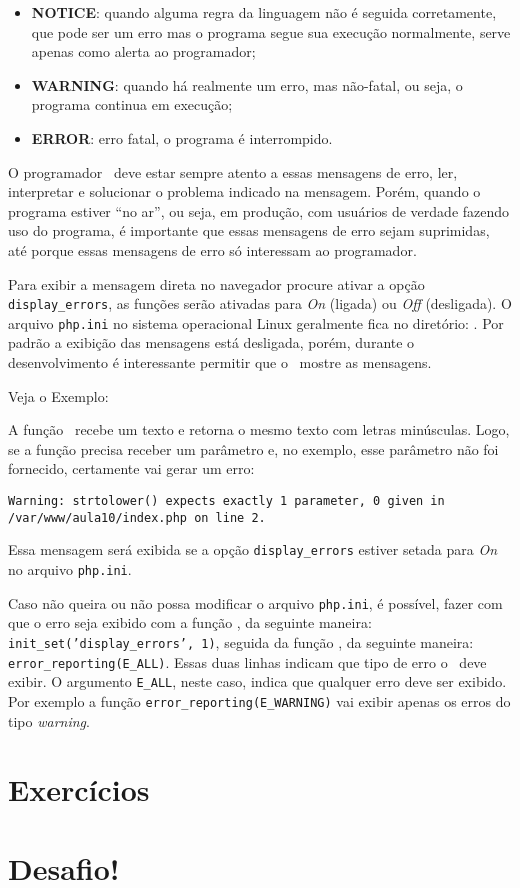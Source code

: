 \begin{itemize}
  \item \textbf{NOTICE}: quando alguma regra da linguagem não é seguida corretamente, 
  que pode ser um erro mas o programa segue sua execução normalmente, serve apenas 
  como alerta ao programador;
  \item \textbf{WARNING}: quando há realmente um erro, mas não-fatal, ou seja, 
  o programa continua em execução;
  \item \textbf{ERROR}: erro fatal, o programa é interrompido.
\end{itemize}

O programador \php~deve estar sempre atento a essas mensagens de erro, ler, interpretar e 
solucionar o problema indicado na mensagem. Porém, quando o programa estiver ``no ar'', 
ou seja, em produção, com usuários de verdade fazendo uso do programa, é importante que 
essas mensagens de erro sejam suprimidas, até porque essas mensagens de erro só interessam 
ao programador.

Para exibir a mensagem direta no navegador procure ativar a opção \texttt{display\_errors}, 
as funções serão ativadas para \textit{On} (ligada) ou \textit{Off} (desligada). O arquivo 
\texttt{php.ini} no sistema operacional Linux geralmente fica no diretório: 
. Por padrão a exibição das mensagens está desligada, porém, 
durante o desenvolvimento é interessante permitir que o \php~mostre as mensagens.

Veja o Exemplo:



A função \funcaostrtolower~recebe um texto e retorna o mesmo texto com letras minúsculas. 
Logo, se a função precisa receber um parâmetro e, no exemplo, esse parâmetro não foi fornecido, 
certamente vai gerar um erro:

\texttt{Warning: strtolower() expects exactly 1 parameter, 0 given in \\ /var/www/aula10/index.php on line 2.}

Essa mensagem será exibida se a opção \texttt{display\_errors} estiver setada para \textit{On} 
no arquivo \texttt{php.ini}.

Caso não queira ou não possa modificar o arquivo \texttt{php.ini}, é possível, fazer com que o erro seja 
exibido com a função \funcaoinitset, da seguinte maneira: \texttt{init\_set('display\_errors', 1)}, 
seguida da função \funcaoerrorreporting, da seguinte maneira: \texttt{error\_reporting(E\_ALL)}. 
Essas duas linhas indicam que tipo de erro o \php~deve exibir. O argumento \texttt{E\_ALL}, neste caso, 
indica que qualquer erro deve ser exibido. Por exemplo a função \texttt{error\_reporting(E\_WARNING)} 
vai exibir apenas os erros do tipo \textit{warning}.




\section{Exercícios}
\label{cap11-exercicios}

\section{Desafio!}
\label{cap11-desafio}
